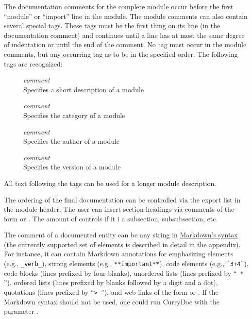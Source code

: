 The documentation comments for the complete module occur before
the first ``module'' or ``import'' line in the module.
The module comments can also contain several special tags. These tags
must be the first thing on its line (in the documentation comment)
and continues until a line has at most the same degree of indentation or
until the end of the comment.
No tag must occur in the module comments, but any
occurring tag as to be in the specified order.
The following tags are recognized:
\begin{description}
\item[] \emph{comment}\\
Specifies a short description of a module
\item[] \emph{comment}\\
Specifies the category of a module
\item[] \emph{comment}\\
Specifies the author of a module
\item[] \emph{comment}\\
Specifies the version of a module
\end{description}
All text following the tags can be used for a longer module description.

The ordering of the final documentation can be controlled via the export list
in the module header.
The user can insert section-headings via comments of the form \ccode{-{}- *} or
\ccode{\{- * }. The amount of \* controls if it i a subsection,
subsubsection, etc.

The comment of a documented entity can be any string in
\href{http://en.wikipedia.org/wiki/Markdown}{Markdown's syntax}
(the currently supported set of elements
is described in detail in the appendix).
For instance, it can contain Markdown annotations for
emphasizing elements (e.g., \verb!_verb_!),
strong elements (e.g., \verb!**important**!),
code elements (e.g., \verb!`3+4`!), code blocks (lines prefixed by four blanks),
unordered lists (lines prefixed by  ``\verb! * !''),
ordered lists (lines prefixed by blanks followed by a digit and a dot),
quotations (lines prefixed by ``\verb!> !''),
and web links of the form 
or .
If the Markdown syntax should not be used, one could run CurryDoc
with the parameter .

